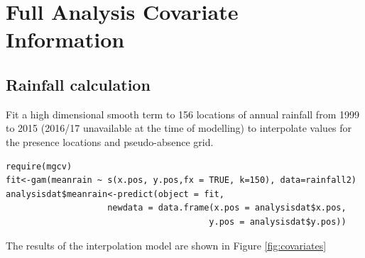 



\section{Full Analysis Covariate Information}

\subsection{Rainfall calculation} 

Fit a high dimensional smooth term to 156 locations of annual rainfall from 1999 to 2015 (2016/17 unavailable at the time of modelling) to interpolate values for the presence locations and pseudo-absence grid.

\begin{verbatim}
require(mgcv)
fit<-gam(meanrain ~ s(x.pos, y.pos,fx = TRUE, k=150), data=rainfall2)
analysisdat$meanrain<-predict(object = fit, 
                    newdata = data.frame(x.pos = analysisdat$x.pos, 
                                        y.pos = analysisdat$y.pos))
\end{verbatim}

The results of the interpolation model are shown in Figure \ref{fig:covariates}

